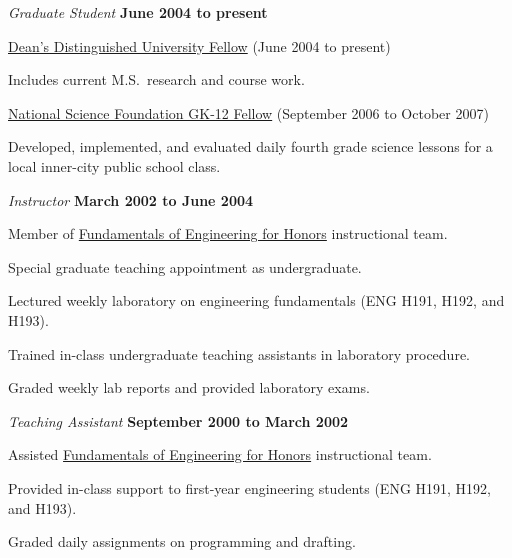 \documentclass[10pt]{article}
\newenvironment{outerlist}[1][\enskip\textbullet]%
        {\begin{enumerate}[#1]}{\end{enumerate}%
         \vspace{-.6\baselineskip}}
\newenvironment{innerlist}[1][\enskip\textbullet]%
        {\begin{compactenum}[#1]}{\end{compactenum}}
\begin{document}
\begin{outerlist}
\item[] \textit{Graduate Student}%
        \hfill \textbf{June 2004 to present}
\begin{innerlist}
\item \href{http://www.gradsch.osu.edu/Content.aspx?Content=44&itemid=2}
           {Dean's Distinguished University Fellow}
      (June 2004 to present)
        \begin{innerlist}
        \item[] Includes current M.S.~research and course work.
        \end{innerlist}
\item \href{http://www.nsfgk12.org/}
           {National Science Foundation GK-12 Fellow}
      (September 2006 to October 2007)
        \begin{innerlist}
        \item[] Developed, implemented, and evaluated daily fourth grade
                science lessons for a local inner-city public school
                class.
        \end{innerlist}
\end{innerlist}

\item[] \textit{Instructor}%
        \hfill \textbf{March 2002 to June 2004}
\begin{innerlist}
\item Member of \href{http://feh.eng.ohio-state.edu/}
                     {Fundamentals of Engineering for Honors} 
      instructional team.
\item Special graduate teaching appointment as undergraduate.
\item Lectured weekly laboratory on engineering fundamentals (ENG H191,
        H192, and H193).
\item Trained in-class undergraduate teaching assistants in laboratory
        procedure.
\item Graded weekly lab reports and provided laboratory exams.
\end{innerlist}

\item[] \textit{Teaching Assistant}%
        \hfill \textbf{September 2000 to March 2002}
\begin{innerlist}
\item Assisted \href{http://feh.eng.ohio-state.edu/}
                    {Fundamentals of Engineering for Honors}
      instructional team.
\item Provided in-class support to first-year engineering students (ENG
        H191, H192, and H193).
\item Graded daily assignments on programming and drafting.
\end{innerlist}


\end{outerlist}
\end{document}
